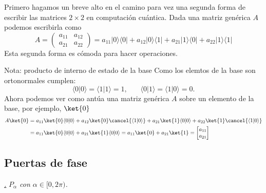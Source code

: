 \documentclass[a4paper,11pt]{book} %
\numberwithin{equation}{chapter}
\def\lp{\left(}
\def\rp{\right)}
\newcommand{\braket}[2]{\langle #1|#2\rangle}
\newcommand{\ketbra}[2]{| #1\rangle \! \langle #2|}
\def\subsubiContadorIt{\par\addtocounter{subsubsection}{1}\underline{\it\thesubsubsection.}\hskip0.5cm \setcounter{subsubsubsectionIt}{0}}
\newcommand{\SubsubiIt}[1]{
		\subsubiContadorIt \textit{#1}
	}
\newcounter{subsubsubsectionIt}[subsubsection]
\begin{document}
Primero hagamos un breve alto en el camino para vez una segunda forma de escribir las matrices $2\times2$ en computación cuántica. Dada una matriz genérica $A$ podemos escribirla como
\begin{equation}
A = \lp \begin{matrix}
a_{11} & a_{12} \\
a_{21} & a_{22}
\end{matrix} \rp = 
a_{11} \ketbra{0}{0} + a_{12} \ketbra{0}{1} +  a_{21} \ketbra{1}{0} +  a_{22} \ketbra{1}{1} 
\end{equation}
Esta segunda forma es cómoda para hacer operaciones. 

	\begin{mybox_blue}{Nota: producto de interno de estado de la base}
	Como los elemtos de la base son ortonormales cumplen:
	\begin{equation}
	\braket{0}{0} = \braket{1}{1} = 1, ~~~~~~~~ \braket{0}{1}=\braket{1}{0}=0.
	\end{equation}
	Ahora podemos ver como antúa una matriz genérica $A$ sobre un elemento de la base, por ejemplo, $\ket{0}$
	\begin{align*}
	A \ket{0} & = a_{11} \ket{0}\braket{0}{0} + a_{12} \ket{0} \cancel{\braket{1}{0}} +  
		a_{21} \ket{1}\braket{0}{0} +  a_{22} \ket{1} \cancel{\braket{1}{0}} \\
	& = a_{11} \ket{0}\braket{0}{0} + a_{21} \ket{1}\braket{0}{0} = a_{11} \ket{0} + a_{21}\ket{1} =
	\begin{bmatrix} a_{11} \\ a_{21} \end{bmatrix}
	\end{align*}
	

	\end{mybox_blue}
	
        \subsection{Puertas de fase} 
		    \SubsubiIt{$P_\alpha$ con $\alpha \in [ 0, 2\pi ) $.}
\end{document}
